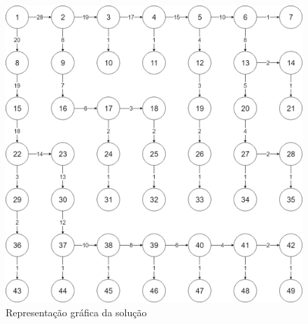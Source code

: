 \documentclass[11pt]{article} %
\begin{document}
	\begin{figure}[!htpb]
		\centering
    		\includegraphics[width=5in]{grafo1c.png}
    		\caption{Representação gráfica da solução}
	\end{figure}
\end{document}
